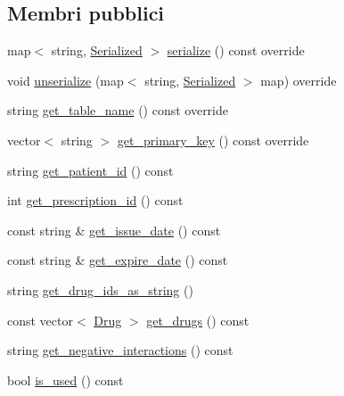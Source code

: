 \subsection*{Membri pubblici}
\begin{DoxyCompactItemize}
\item 
map$<$ string, \mbox{\hyperlink{structmm_1_1_serialized}{Serialized}} $>$ \mbox{\hyperlink{classmm_1_1model_1_1_prescription_a592ff88dfa9625a383a7b073a64863b1}{serialize}} () const override
\item 
void \mbox{\hyperlink{classmm_1_1model_1_1_prescription_a6c38e4ee2fca09b18d61aaa214316b9e}{unserialize}} (map$<$ string, \mbox{\hyperlink{structmm_1_1_serialized}{Serialized}} $>$ map) override
\item 
string \mbox{\hyperlink{classmm_1_1model_1_1_prescription_a8de9a927dc92c0e0b15dac6f930889e3}{get\+\_\+table\+\_\+name}} () const override
\item 
vector$<$ string $>$ \mbox{\hyperlink{classmm_1_1model_1_1_prescription_af521915f8872df18ae4a50ff2a4f59ff}{get\+\_\+primary\+\_\+key}} () const override
\item 
string \mbox{\hyperlink{classmm_1_1model_1_1_prescription_a90cbaab7bb67d3d135e622e58a8f108d}{get\+\_\+patient\+\_\+id}} () const
\item 
int \mbox{\hyperlink{classmm_1_1model_1_1_prescription_a6179b066586ebb5a1dc0d8f6a6c11a45}{get\+\_\+prescription\+\_\+id}} () const
\item 
const string \& \mbox{\hyperlink{classmm_1_1model_1_1_prescription_acb29f51441390f5c0e5c483d82ba1514}{get\+\_\+issue\+\_\+date}} () const
\item 
const string \& \mbox{\hyperlink{classmm_1_1model_1_1_prescription_a11c574c3fafddc2e278c8aec417d5977}{get\+\_\+expire\+\_\+date}} () const
\item 
string \mbox{\hyperlink{classmm_1_1model_1_1_prescription_abbc707b103a6f8b52b94fec5ec7ebf89}{get\+\_\+drug\+\_\+ids\+\_\+as\+\_\+string}} ()
\item 
const vector$<$ \mbox{\hyperlink{classmm_1_1model_1_1_drug}{Drug}} $>$ \mbox{\hyperlink{classmm_1_1model_1_1_prescription_a0dbc18b00e03ec68f3d224d11bf75823}{get\+\_\+drugs}} () const
\item 
string \mbox{\hyperlink{classmm_1_1model_1_1_prescription_a1656851efd03bd54f3615d90856e9829}{get\+\_\+negative\+\_\+interactions}} () const
\item 
bool \mbox{\hyperlink{classmm_1_1model_1_1_prescription_a23ae0807248a2cd86232b11927c9eea2}{is\+\_\+used}} () const

\end{DoxyCompactItemize}
